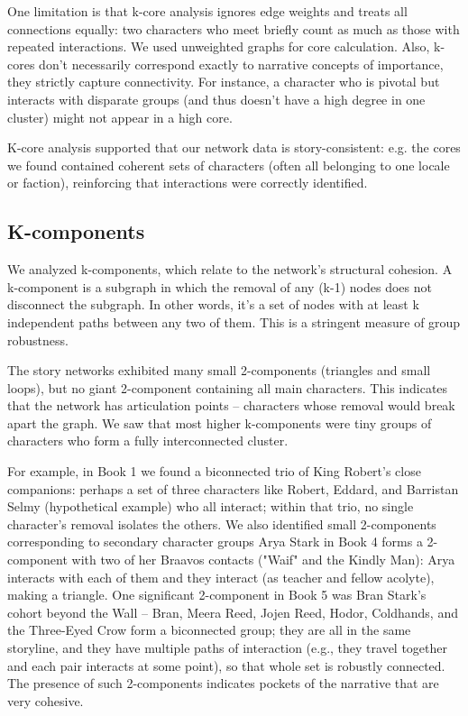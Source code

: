 \documentclass[12pt, a4paper]{article}
\begin{document}
One limitation is that k-core analysis ignores edge weights and treats all connections equally: two characters who meet briefly count as much as those with repeated interactions. We used unweighted graphs for core calculation. Also, k-cores don't necessarily correspond exactly to narrative concepts of importance, they strictly capture connectivity. 
For instance, a character who is pivotal but interacts with disparate groups (and thus doesn't have a high degree in one cluster) might not appear in a high core.

K-core analysis supported that our network data is story-consistent: e.g. the cores we found contained coherent sets of characters (often all belonging to one locale or faction), reinforcing that interactions were correctly identified.


\subsection*{K-components}

We analyzed k-components, which relate to the network's structural cohesion. A k-component is a subgraph in which the removal of any (k-1) nodes does not disconnect the subgraph. In other words, it's a set of nodes with at least k independent paths between any two of them. This is a stringent measure of group robustness. 

The story networks exhibited many small 2-components (triangles and small loops), but no giant 2-component containing all main characters. This indicates that the network has articulation points – characters whose removal would break apart the graph. 
We saw that most higher k-components were tiny groups of characters who form a fully interconnected cluster. 

For example, in Book 1 we found a biconnected trio of King Robert's close companions: perhaps a set of three characters like Robert, Eddard, and Barristan Selmy (hypothetical example) who all interact; within that trio, no single character's removal isolates the others. We also identified small 2-components corresponding to secondary character groups
 Arya Stark in Book 4 forms a 2-component with two of her Braavos contacts ("Waif" and the Kindly Man): Arya interacts with each of them and they interact (as teacher and fellow acolyte), making a triangle. One significant 2-component in Book 5 was Bran Stark's cohort beyond the Wall – Bran, Meera Reed, Jojen Reed, Hodor, Coldhands, and the Three-Eyed Crow form a biconnected group; they are all in the same storyline, and they have multiple paths of interaction (e.g., they travel together and each pair interacts at some point), so that whole set is robustly connected. The presence of such 2-components indicates pockets of the narrative that are very cohesive. 
 
\end{document}
